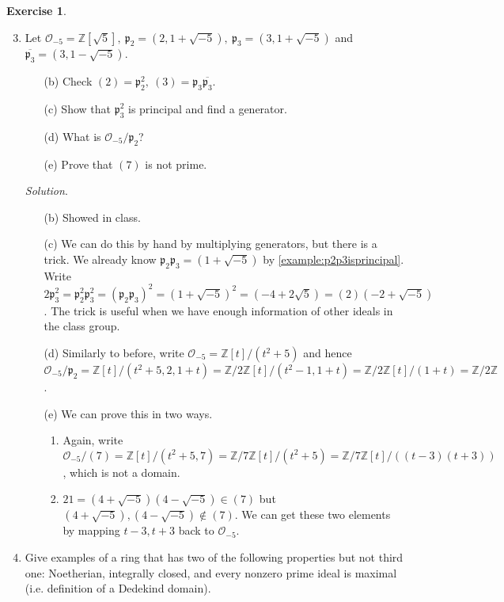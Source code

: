 \documentclass{article}
\newcommand{\Z}{\mathbb{Z}}
\newcommand{\ri}{\mathcal{O}}
\newcommand{\ip}{\mathfrak{p}}
\theoremstyle{definition}
\newtheorem{exe}[defn]{Exercise}
\begin{document}
\begin{exe}
\begin{enumerate}
\setcounter{enumi}{2}
\item Let $\ri_{-5}=\Z\left[\sqrt 5\right],\ \ip_2=\left(2,1+\sqrt{-5}\right),\ \ip_3=\left(3,1+\sqrt{-5}\right)$ and $\overline{\ip_3}=\left(3,1-\sqrt{-5}\right)$.
\begin{enumerate}
\item[(b)] Check $(2)=\ip_2^2,\ (3)=\ip_3\overline{\ip_3}$.
\item[(c)] Show that $\ip_3^2$ is principal and find a generator. 
\item[(d)] What is $\ri_{-5}/\ip_2$?
\item[(e)] Prove that $(7)$ is not prime.
\end{enumerate}

\textit{Solution}. \begin{enumerate}
\item[(b)] Showed in class.
\item[(c)] We can do this by hand by multiplying generators, but there is a trick. We already know $\ip_2\ip_3=\left(1+\sqrt{-5}\right)$ by \ref{example:p2p3isprincipal}. Write $2\ip_3^2=\ip_2^2\ip_3^2=(\ip_2\ip_3)^2=\left(1+\sqrt{-5}\right)^2=\left(-4+2\sqrt{5}\right)=(2)\left(-2+\sqrt{-5}\right)$. The trick is useful when we have enough information of other ideals in the class group.
\item[(d)] Similarly to before, write $\ri_{-5}=\Z[t]/(t^2+5)$ and hence $\ri_{-5}/\ip_2=\Z[t]/(t^2+5,2,1+t)=\Z/2\Z[t]/(t^2-1,1+t)=\Z/2\Z[t]/(1+t)=\Z/2\Z$.
\item[(e)] We can prove this in two ways.
\begin{enumerate}
\item Again, write $\ri_{-5}/(7)=\Z[t]/(t^2+5,7)=\Z/7\Z[t]/(t^2+5)=\Z/7\Z[t]/((t-3)(t+3))$, which is not a domain.
\item $21=\left(4+\sqrt{-5}\right)\left(4-\sqrt{-5}\right)\in (7)$ but $\left(4+\sqrt{-5}\right),\left(4-\sqrt{-5}\right)\notin (7)$. We can get these two elements by mapping $t-3,t+3$ back to $\ri_{-5}$.
\end{enumerate}
\end{enumerate}
\item Give examples of a ring that has two of the following properties but not third one: Noetherian, integrally closed, and every nonzero prime ideal is maximal (i.e. definition of a Dedekind domain).


\end{enumerate}
\end{exe}
\end{document}
